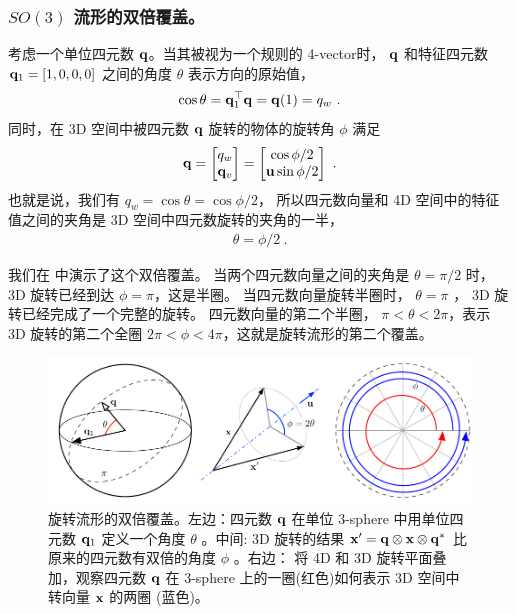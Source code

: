 \subsubsection{ $SO(3)$ 流形的双倍覆盖。}
\label{sec:double_cover}

考虑一个单位四元数 ${\bf q}$。当其被视为一个规则的 4-vector时， ${\bf q}$ 和特征四元数 ${\bf q}_1=[1,0,0,0]$ 之间的角度 $\theta$ 表示方向的原始值，
%
\begin{align}
\cos\theta = {\bf q}_1^{\top}{\bf q} = {\bf q}(1) = q_w
~.
\end{align}
%
同时，在 3D 空间中被四元数 ${\bf q}$ 旋转的物体的旋转角 $\phi$ 满足
%
\begin{align}
{\bf q} = \begin{bmatrix}
q_w \\ {\bf q}_v
\end{bmatrix} = \begin{bmatrix}
\cos\phi/2 \\ {\bf u}\sin\phi/2
\end{bmatrix}
~.
\end{align}
%
也就是说，我们有 $q_w = \cos\theta = \cos\phi/2$，
所以四元数向量和 4D 空间中的特征值之间的夹角是 3D 空间中四元数旋转的夹角的一半，
%
\begin{align}
\theta = \phi/2
~.
\end{align}

我们在  中演示了这个双倍覆盖。
当两个四元数向量之间的夹角是 $\theta=\pi/2$ 时， 3D 旋转已经到达 $\phi=\pi$，这是半圈。 
当四元数向量旋转半圈时， $\theta=\pi$ ， 3D 旋转已经完成了一个完整的旋转。 
四元数向量的第二个半圈， $\pi<\theta<2\pi$，表示 3D 旋转的第二个全圈 $2\pi<\phi<4\pi$，这就是旋转流形的第二个覆盖。

\begin{figure}[htbp]
\begin{center}
\includegraphics{figures/double_cover}
\caption{旋转流形的双倍覆盖。左边：四元数 ${\bf q}$ 在单位 3-sphere 中用单位四元数 ${\bf q}_1$ 定义一个角度 $\theta$ 。中间: 3D 旋转的结果 ${\bf x}'={\bf q}\otimes{\bf x}\otimes{\bf q}^*$ 比原来的四元数有双倍的角度 $\phi$ 。右边： 将 4D 和 3D 旋转平面叠加，观察四元数 ${\bf q}$ 在 3-sphere 上的一圈(红色)如何表示 3D 空间中转向量 ${\bf x}$ 的两圈 (蓝色)。}
\label{fig:double_cover}
\end{center}
\end{figure}



